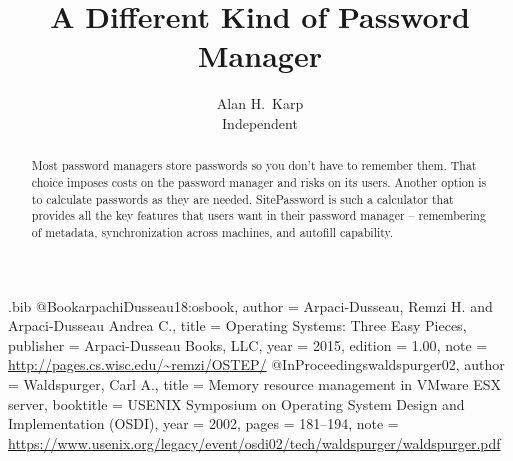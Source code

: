 \usepackage{tikz}
\usepackage{amsmath}

\usepackage{filecontents}

\begin{filecontents}{\jobname.bib}
@Book{arpachiDusseau18:osbook,
  author =       {Arpaci-Dusseau, Remzi H. and Arpaci-Dusseau Andrea C.},
  title =        {Operating Systems: Three Easy Pieces},
  publisher =    {Arpaci-Dusseau Books, LLC},
  year =         2015,
  edition =      {1.00},
  note =         {\url{http://pages.cs.wisc.edu/~remzi/OSTEP/}}
}
@InProceedings{waldspurger02,
  author =       {Waldspurger, Carl A.},
  title =        {Memory resource management in {VMware ESX} server},
  booktitle =    {USENIX Symposium on Operating System Design and
                  Implementation (OSDI)},
  year =         2002,
  pages =        {181--194},
  note =         {\url{https://www.usenix.org/legacy/event/osdi02/tech/waldspurger/waldspurger.pdf}}}
\end{filecontents}



\date{}

\title{\Large \bf A Different Kind of Password Manager}

\def\plainauthor{Author name(s) for PDF metadata. Don't forget to anonymize for submission!}

\author{
{\rm Alan H.\ Karp}\\
Independent
} %

\maketitle
\thecopyright

\begin{abstract}
Most password managers store passwords so you don't have
to remember them.  That choice imposes costs on the password
manager and risks on its users.  Another option is to calculate
passwords as they are needed.  SitePassword is such a
calculator that provides all the key features that
users want in their password manager -- remembering of metadata, 
synchronization across machines, and autofill capability.
\end{abstract}


